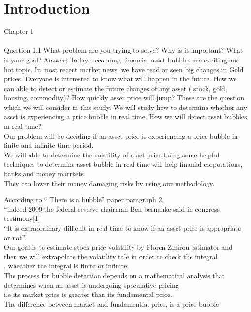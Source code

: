 \section{Introduction}
Chapter 1\\\\
Question 1.1 What problem are you trying to solve?  Why is it important? What is your goal?
Answer: Today's economy, financial asset bubbles are exciting and hot topic. 
In most recent market news, we have read or seen big changes in Gold prices. 
Everyone is interested to know what will happen in the future. 
How we can able to detect or estimate the future changes of any asset ( stock, gold, housing, commodity)? 
How quickly asset price will jump? These are the question which we will consider in this study. 
We will study how to determine whether any asset is experiencing a price bubble in real time. 
How we will detect asset bubbles in real time?\\
Our problem will be deciding if an asset price is experiencing a price bubble in finite and infinite time period.\\
We will able to determine the volatility of asset price.Using some helpful techniques to determine asset bubble in real time will help finanial corporations, banks,and money marrkets.\\
They can lower their money damaging risks by using our methodology.

According to `` There is a bubble'' paper paragraph 2, \\
``indeed 2009 the federal reserve chairman Ben bernanke said in congress testimony[1]\\
``It is extraordinary difficult in real time to know if an asset price is appropriate or not''.\\
Our goal is to estimate stock price volatility by Floren Zmirou estimator and then we will extrapolate the volatility tale in order to check the integral\\.
wheather the integral is finite or infinite. \\
 The process for bubble detection depends on a mathematical analysis that determines when an asset is undergoing speculative pricing\\
 i.e its market price is greater than its fundamental price.\\
 The difference between market and fundamential price, is a price bubble 
 
 
 
 


